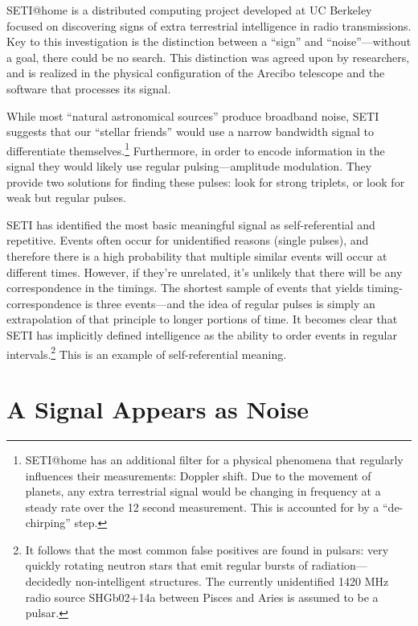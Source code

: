 \documentclass{thesis}
\begin{document}
SETI@home\cite{seti_about_????} is a distributed computing project developed at UC Berkeley focused on discovering signs of extra terrestrial intelligence in radio transmissions. Key to this investigation is the distinction between a ``sign'' and ``noise''---without a goal, there could be no search. This distinction was agreed upon by researchers, and is realized in the physical configuration of the Arecibo telescope and the software that processes its signal.

While most ``natural astronomical sources'' produce broadband noise, SETI suggests that our ``stellar friends'' would use a narrow bandwidth signal to differentiate themselves.\footnote{SETI@home has an additional filter for a physical phenomena that regularly influences their measurements: Doppler shift. Due to the movement of planets, any extra terrestrial signal would be changing in frequency at a steady rate over the 12 second measurement. This is accounted for by a ``de-chirping'' step.} Furthermore, in order to encode information in the signal they would likely use regular pulsing---amplitude modulation. They provide two solutions for finding these pulses: look for strong triplets, or look for weak but regular pulses.
	
SETI has identified the most basic meaningful signal as self-referential and repetitive. Events often occur for unidentified reasons (single pulses), and therefore there is a high probability that multiple similar events will occur at different times. However, if they're unrelated, it's unlikely that there will be any correspondence in the timings. The shortest sample of events that yields timing-correspondence is three events---and the idea of regular pulses is simply an extrapolation of that principle to longer portions of time. It becomes clear that SETI has implicitly defined intelligence as the ability to order events in regular intervals.\footnote{It follows that the most common false positives are found in pulsars: very quickly rotating neutron stars that emit regular bursts of radiation---decidedly non-intelligent structures. The currently unidentified 1420 MHz radio source SHGb02+14a between Pisces and Aries is assumed to be a pulsar.\cite{eugenie_samuel_reich_mysterious_2004}} This is an example of self-referential meaning.

\section{A Signal Appears as Noise}
\end{document}
